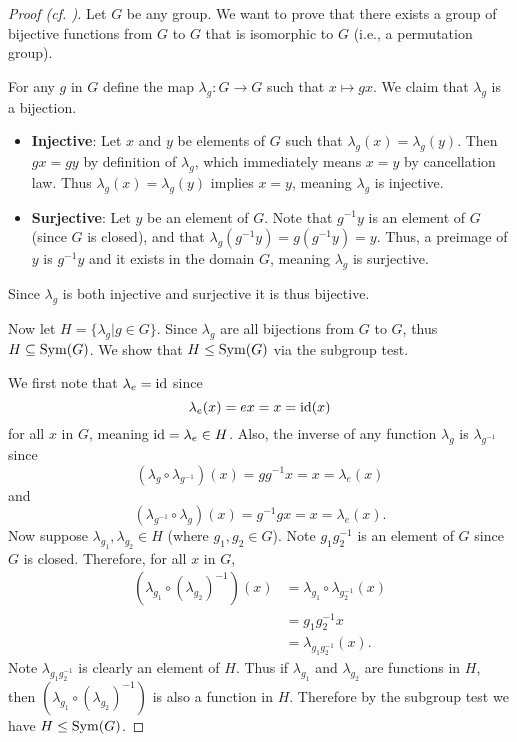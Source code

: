 \begin{proof}[Proof (cf. {\cite[Proof 2]{proofwiki_cayleys-theorem}})]
    Let $G$ be any group. We want to prove that there exists a group of bijective functions from $G$ to $G$ that is isomorphic to $G$ (i.e., a permutation group).

    For any $g$ in $G$ define the map $\lambda_g: G \to G$ such that $x \mapsto gx$. We claim that $\lambda_g$ is a bijection.
    \begin{itemize}
        \item \textbf{Injective}: Let $x$ and $y$ be elements of $G$ such that $\lambda_g(x) = \lambda_g(y)$. Then $gx = gy$ by definition of $\lambda_g$, which immediately means $x = y$ by cancellation law. Thus $\lambda_g(x) = \lambda_g(y)$ implies $x = y$, meaning $\lambda_g$ is injective.
        
        \item \textbf{Surjective}: Let $y$ be an element of $G$. Note that $g^{-1}y$ is an element of $G$ (since $G$ is closed), and that $\lambda_g(g^{-1}y) = g(g^{-1}y) = y$. Thus, a preimage of $y$ is $g^{-1}y$ and it exists in the domain $G$, meaning $\lambda_g$ is surjective.
    \end{itemize}
    Since $\lambda_g$ is both injective and surjective it is thus bijective.

    Now let $H = \{\lambda_g \vert g \in G\}$. Since $\lambda_g$ are all bijections from $G$ to $G$, thus $H \subseteq \mathrm{Sym}(G)$. We show that $H \leq \mathrm{Sym}(G)$ via the subgroup test.

    We first note that $\lambda_e = \mathrm{id}$ since
    \[
        \lambda_e(x) = ex = x = \mathrm{id}(x)
    \]
    for all $x$ in $G$, meaning $\mathrm{id} = \lambda_e \in H$. Also, the inverse of any function $\lambda_g$ is $\lambda_{g^{-1}}$ since
    \[
        (\lambda_g \circ \lambda_{g^{-1}})(x) = gg^{-1}x = x = \lambda_e(x)
    \]
    and
    \[
        (\lambda_{g^{-1}} \circ \lambda_g)(x) = g^{-1}gx = x = \lambda_e(x).
    \]
    Now suppose $\lambda_{g_1}, \lambda_{g_2} \in H$ (where $g_1, g_2 \in G$). Note $g_1g_2^{-1}$ is an element of $G$ since $G$ is closed. Therefore, for all $x$ in $G$,
    \begin{align*}
        \left(\lambda_{g_1} \circ \left(\lambda_{g_2}\right)^{-1}\right)(x) &= \lambda_{g_1}\circ\lambda_{g_2^{-1}}(x)\\
        &= g_1g_2^{-1}x\\
        &= \lambda_{g_1g_2^{-1}}(x).
    \end{align*}
    Note $\lambda_{g_1g_2^{-1}}$ is clearly an element of $H$. Thus if $\lambda_{g_1}$ and $\lambda_{g_2}$ are functions in $H$, then $\left(\lambda_{g_1} \circ \left(\lambda_{g_2}\right)^{-1}\right)$ is also a function in $H$. Therefore by the subgroup test we have $H \leq \mathrm{Sym}(G)$.


\end{proof}
